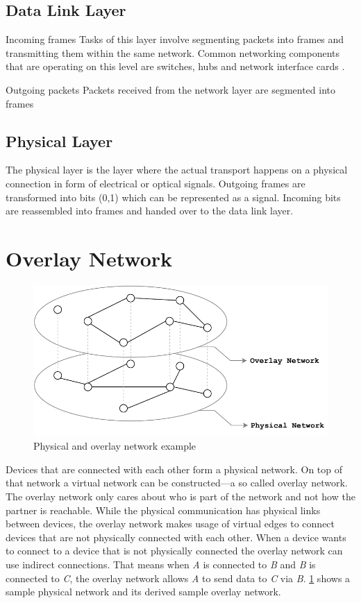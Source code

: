\subsection{Data Link Layer}
Incoming frames\newline
Tasks of this layer involve segmenting packets into frames and transmitting them within the same network.
Common networking components that are operating on this level are switches, hubs and network interface cards \cite{simoneau2006}.

Outgoing packets\newline
Packets received from the network layer are segmented into frames 

\subsection{Physical Layer}
The physical layer is the layer where the actual transport happens on a physical connection in form of electrical or optical signals.
Outgoing frames are transformed into bits (0,1) which can be represented as a signal.
Incoming bits are reassembled into frames and handed over to the data link layer.


\section{Overlay Network}
\begin{figure}[htb!]
\centering
\includegraphics[width=.5\textwidth]{graphics/physical-vs-overlay-network.pdf}
\caption{Physical and overlay network example}
\label{fig:overlay}
\end{figure}
Devices that are connected with each other form a physical network. On top of that network a virtual network can be constructed—a so called overlay network. The overlay network only cares about who is part of the network and not how the partner is reachable. 
While the physical communication has physical links between devices, the overlay network makes usage of virtual edges to connect devices that are not physically connected with each other. When a device wants to connect to a device that is not physically connected the overlay network can use indirect connections. That means when \textit{A} is connected to \textit{B} and \textit{B} is connected to \textit{C}, the overlay network allows \textit{A} to send data to \textit{C} via \textit{B}.
\cref{fig:overlay} shows a sample physical network and its derived sample overlay network.

